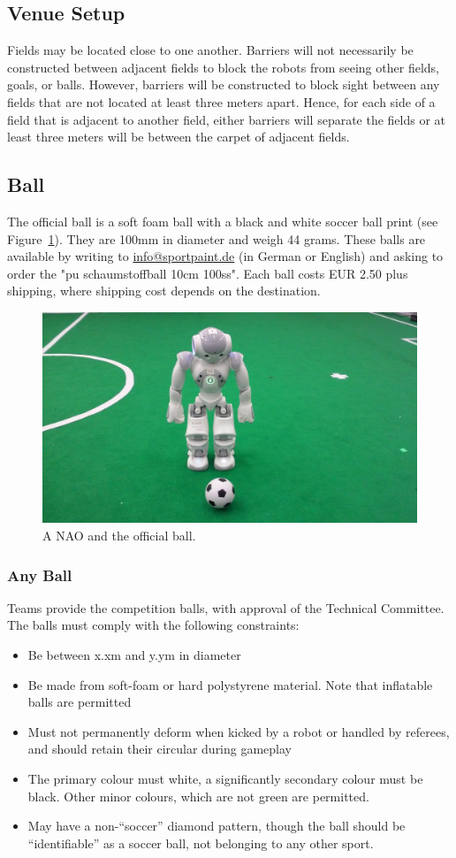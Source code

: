 \documentclass[12pt]{article}
\begin{document}
\subsection{Venue Setup}
\label{sec:boundaries}
Fields may be located close to one another.  Barriers will not necessarily be constructed between adjacent fields to block the robots from seeing other fields, goals, or balls.  However, barriers will be constructed to block sight between any fields that are not located at least three meters apart.  Hence, for each side of a field that is adjacent to another field, either barriers will separate the fields or at least three meters will be between the carpet of adjacent fields.

\subsection{Ball}
\label{sec:ball}

The official ball is a soft foam ball with a black and white soccer ball print (see Figure~\ref{fig:ball}). They are 100mm in diameter and weigh 44 grams. These balls are available by writing to \url{info@sportpaint.de} (in German or English) and asking to order the "pu schaumstoffball 10cm 100ss".  Each ball costs EUR 2.50 plus shipping, where shipping cost depends on the destination.

\begin{figure}[t]
  \centerline{\includegraphics[height=0.28\columnwidth]{figs/robotWithBall2016.jpg}}
  \caption{A NAO and the official ball.}
  \label{fig:ball}
\end{figure}

\subsubsection{Any Ball}

Teams provide the competition balls, with approval of the Technical Committee.
The balls must comply with the following constraints:
\begin{itemize}
    \item Be between x.xm and y.ym in diameter
    \item Be made from soft-foam or hard polystyrene material. Note that inflatable balls are permitted
    \item Must not permanently deform when kicked by a robot or handled by referees, and should retain their circular during gameplay
    \item The primary colour must white, a significantly secondary colour must be black. Other minor colours, which are not green are permitted.
    \item May have a non-``soccer'' diamond pattern, though the ball should be ``identifiable'' as a soccer ball, not belonging to any other sport.
\end{itemize}
\end{document}
